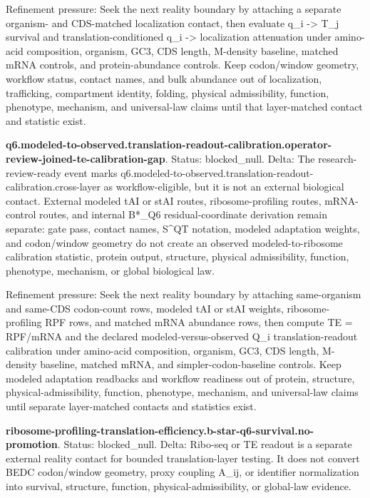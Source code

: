 Refinement pressure: Seek the next reality boundary by attaching a separate organism- and CDS-matched localization contact, then evaluate q\_i -> T\_j survival and translation-conditioned q\_i -> localization attenuation under amino-acid composition, organism, GC3, CDS length, M-density baseline, matched mRNA controls, and protein-abundance controls. Keep codon/window geometry, workflow status, contact names, and bulk abundance out of localization, trafficking, compartment identity, folding, physical admissibility, function, phenotype, mechanism, and universal-law claims until that layer-matched contact and statistic exist.

\textbf{q6.modeled-to-observed.translation-readout-calibration.operator-review-joined-te-calibration-gap}. Status: blocked\_null. Delta: The research-review-ready event marks q6.modeled-to-observed.translation-readout-calibration.cross-layer as workflow-eligible, but it is not an external biological contact. External modeled tAI or stAI routes, ribosome-profiling routes, mRNA-control routes, and internal B*\_Q6 residual-coordinate derivation remain separate: gate pass, contact names, S\textasciicircum{}QT notation, modeled adaptation weights, and codon/window geometry do not create an observed modeled-to-ribosome calibration statistic, protein output, structure, physical admissibility, function, phenotype, mechanism, or global biological law.

Refinement pressure: Seek the next reality boundary by attaching same-organism and same-CDS codon-count rows, modeled tAI or stAI weights, ribosome-profiling RPF rows, and matched mRNA abundance rows, then compute TE = RPF/mRNA and the declared modeled-versus-observed Q\_i translation-readout calibration under amino-acid composition, organism, GC3, CDS length, M-density baseline, matched mRNA, and simpler-codon-baseline controls. Keep modeled adaptation readbacks and workflow readiness out of protein, structure, physical-admissibility, function, phenotype, mechanism, and universal-law claims until separate layer-matched contacts and statistics exist.

\textbf{ribosome-profiling-translation-efficiency.b-star-q6-survival.no-promotion}. Status: blocked\_null. Delta: Ribo-seq or TE readout is a separate external reality contact for bounded translation-layer testing. It does not convert BEDC codon/window geometry, proxy coupling A\_ij, or identifier normalization into survival, structure, function, physical-admissibility, or global-law evidence.

